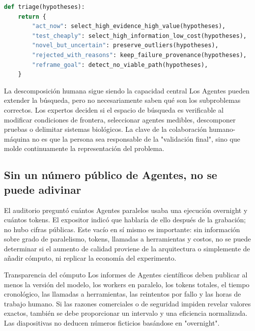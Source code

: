 \begin{lstlisting}[language=Python,caption={Estratificación de informes que equilibra prioridad y señales débiles}]
def triage(hypotheses):
    return {
        "act_now": select_high_evidence_high_value(hypotheses),
        "test_cheaply": select_high_information_low_cost(hypotheses),
        "novel_but_uncertain": preserve_outliers(hypotheses),
        "rejected_with_reasons": keep_failure_provenance(hypotheses),
        "reframe_goal": detect_no_viable_path(hypotheses),
    }
\end{lstlisting}


\begin{importantbox}{La descomposición humana sigue siendo la capacidad central}
Los Agentes pueden extender la búsqueda, pero no necesariamente saben qué son los subproblemas correctos. Los expertos deciden si el espacio de búsqueda es verificable al modificar condiciones de frontera, seleccionar agentes medibles, descomponer pruebas o delimitar sistemas biológicos. La clave de la colaboración humano-máquina no es que la persona sea responsable de la "validación final", sino que molde continuamente la representación del problema.
\end{importantbox}

\subsection{Sin un número público de Agentes, no se puede adivinar}

El auditorio preguntó cuántos Agentes paralelos usaba una ejecución overnight y cuántos tokens. El expositor indicó que hablaría de ello después de la grabación; no hubo cifras públicas. Este vacío en sí mismo es importante: sin información sobre grado de paralelismo, tokens, llamadas a herramientas y costos, no se puede determinar si el aumento de calidad proviene de la arquitectura o simplemente de añadir cómputo, ni replicar la economía del experimento.

\begin{warningbox}{Transparencia del cómputo}
Los informes de Agentes científicos deben publicar al menos la versión del modelo, los workers en paralelo, los tokens totales, el tiempo cronológico, las llamadas a herramientas, las reintentos por fallo y las horas de trabajo humano. Si las razones comerciales o de seguridad impiden revelar valores exactos, también se debe proporcionar un intervalo y una eficiencia normalizada. Las diapositivas no deducen números ficticios basándose en "overnight".
\end{warningbox}

